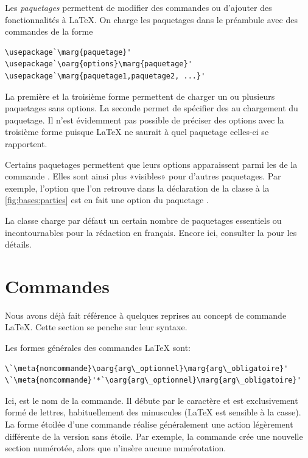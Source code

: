 Les \emph{paquetages} permettent de modifier des commandes ou
d'ajouter des fonctionnalités à {\LaTeX}. On charge les paquetages
dans le préambule avec des commandes de la forme
\begin{lstlisting}
\usepackage`\marg{paquetage}'
\usepackage`\oarg{options}\marg{paquetage}'
\usepackage`\marg{paquetage1,paquetage2, ...}'
\end{lstlisting}
La première et la troisième forme permettent de charger un ou
plusieurs paquetages sans options. La seconde permet de spécifier des
 au chargement du paquetage. Il n'est évidemment pas
possible de préciser des options avec la troisième forme puisque
{\LaTeX} ne saurait à quel paquetage celles-ci se rapportent.

Certains paquetages permettent que leurs options apparaissent parmi
les  de la commande \cmdprint{\documentclass}. Elles
sont ainsi plus «visibles» pour d'autres paquetages. Par exemple,
l'option  que l'on retrouve dans la déclaration de la
classe à la \autoref{fig:bases:parties} est en fait une option du
paquetage .

La classe  charge par défaut un certain nombre de
paquetages essentiels ou incontournables pour la rédaction en
français. Encore ici, consulter la %
pour les détails.


\section{Commandes}
\label{chap:bases:commandes}

Nous avons déjà fait référence à quelques reprises au concept de
commande {\LaTeX}. Cette section se penche sur leur syntaxe.

Les formes générales des commandes {\LaTeX} sont:
\begin{lstlisting}
\`\meta{nomcommande}\oarg{arg\_optionnel}\marg{arg\_obligatoire}'
\`\meta{nomcommande}'*`\oarg{arg\_optionnel}\marg{arg\_obligatoire}'
\end{lstlisting}
Ici,  est le nom de la commande. Il débute par le
caractère {\bs} et est exclusivement formé de lettres, habituellement
des minuscules ({\LaTeX} est sensible à la casse). La forme étoilée
d'une commande réalise généralement une action légèrement différente
de la version sans étoile. Par exemple, la commande \cmd{\section}
crée une nouvelle section numérotée, alors que \cmd{\section*}
n'insère aucune numérotation.

